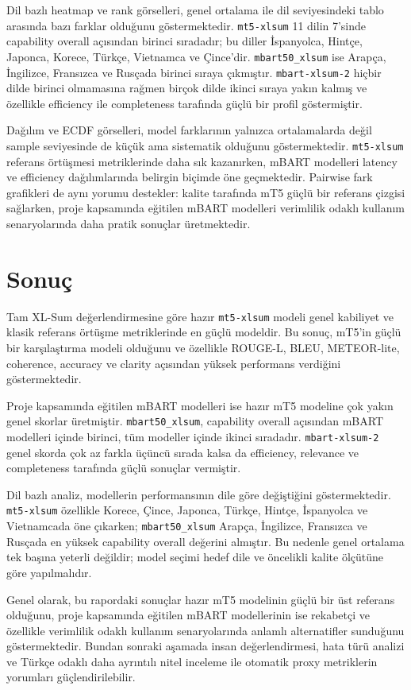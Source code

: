 \documentclass[12pt,a4paper]{article}
\begin{document}
Dil bazlı heatmap ve rank görselleri, genel ortalama ile dil seviyesindeki tablo arasında bazı farklar olduğunu göstermektedir. \texttt{mt5-xlsum} 11 dilin 7'sinde capability overall açısından birinci sıradadır; bu diller İspanyolca, Hintçe, Japonca, Korece, Türkçe, Vietnamca ve Çince'dir. \texttt{mbart50\_xlsum} ise Arapça, İngilizce, Fransızca ve Rusçada birinci sıraya çıkmıştır. \texttt{mbart-xlsum-2} hiçbir dilde birinci olmamasına rağmen birçok dilde ikinci sıraya yakın kalmış ve özellikle efficiency ile completeness tarafında güçlü bir profil göstermiştir.

Dağılım ve ECDF görselleri, model farklarının yalnızca ortalamalarda değil sample seviyesinde de küçük ama sistematik olduğunu göstermektedir. \texttt{mt5-xlsum} referans örtüşmesi metriklerinde daha sık kazanırken, mBART modelleri latency ve efficiency dağılımlarında belirgin biçimde öne geçmektedir. Pairwise fark grafikleri de aynı yorumu destekler: kalite tarafında mT5 güçlü bir referans çizgisi sağlarken, proje kapsamında eğitilen mBART modelleri verimlilik odaklı kullanım senaryolarında daha pratik sonuçlar üretmektedir.

\section{Sonuç}

Tam XL-Sum değerlendirmesine göre hazır \texttt{mt5-xlsum} modeli genel kabiliyet ve klasik referans örtüşme metriklerinde en güçlü modeldir. Bu sonuç, mT5'in güçlü bir karşılaştırma modeli olduğunu ve özellikle ROUGE-L, BLEU, METEOR-lite, coherence, accuracy ve clarity açısından yüksek performans verdiğini göstermektedir.

Proje kapsamında eğitilen mBART modelleri ise hazır mT5 modeline çok yakın genel skorlar üretmiştir. \texttt{mbart50\_xlsum}, capability overall açısından mBART modelleri içinde birinci, tüm modeller içinde ikinci sıradadır. \texttt{mbart-xlsum-2} genel skorda çok az farkla üçüncü sırada kalsa da efficiency, relevance ve completeness tarafında güçlü sonuçlar vermiştir.

Dil bazlı analiz, modellerin performansının dile göre değiştiğini göstermektedir. \texttt{mt5-xlsum} özellikle Korece, Çince, Japonca, Türkçe, Hintçe, İspanyolca ve Vietnamcada öne çıkarken; \texttt{mbart50\_xlsum} Arapça, İngilizce, Fransızca ve Rusçada en yüksek capability overall değerini almıştır. Bu nedenle genel ortalama tek başına yeterli değildir; model seçimi hedef dile ve öncelikli kalite ölçütüne göre yapılmalıdır.

Genel olarak, bu rapordaki sonuçlar hazır mT5 modelinin güçlü bir üst referans olduğunu, proje kapsamında eğitilen mBART modellerinin ise rekabetçi ve özellikle verimlilik odaklı kullanım senaryolarında anlamlı alternatifler sunduğunu göstermektedir. Bundan sonraki aşamada insan değerlendirmesi, hata türü analizi ve Türkçe odaklı daha ayrıntılı nitel inceleme ile otomatik proxy metriklerin yorumları güçlendirilebilir.

\clearpage
\appendix

\end{document}
